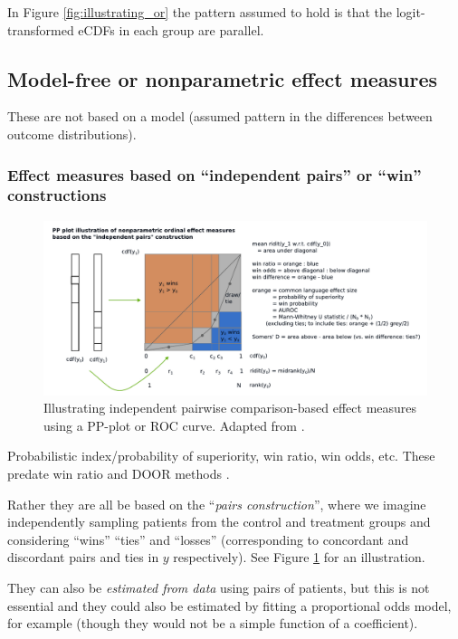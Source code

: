 \documentclass[
  11pt,
  fleqn
]{article}
\begin{document}
In Figure \ref{fig:illustrating_or} the pattern assumed to hold is
that the logit-transformed eCDFs in each group are parallel.

\subsection{Model-free or nonparametric effect measures}

These are not based on a model (assumed pattern in the differences
between outcome distributions).

\subsubsection{Effect measures based on ``independent pairs'' or
``win'' constructions}

\begin{figure}
  \includegraphics[width=7.5in]{effect_measures_pp_plot.pdf}
  \caption{Illustrating independent pairwise comparison-based effect
    measures using a PP-plot or ROC curve. Adapted from
  \citet{smithsonReceiverOperatingCharacteristic2023}.}
  \label{fig:illustrating_pairwise_comparisons}
\end{figure}

Probabilistic index/probability of
superiority, win ratio, win odds, etc. These predate win ratio and
DOOR methods
\citep[e.g.][p.~14]{agrestiAnalysisOrdinalCategorical2010}.

Rather they are all be based on the ``\emph{pairs construction}'',
where we imagine independently sampling patients from the control and
treatment groups and considering ``wins'' ``ties'' and ``losses''
(corresponding to concordant and discordant pairs and ties in $y$
respectively). See Figure \ref{fig:illustrating_pairwise_comparisons}
for an illustration.

They can
also be \emph{estimated from data} using pairs of patients, but this
is not essential and they could also be estimated by fitting a
proportional odds model, for example (though they would not be a
simple function of a coefficient).
\end{document}

